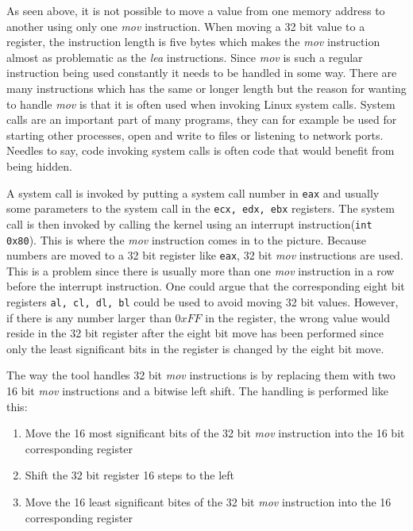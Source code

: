 \documentclass[11pt,twoside]{eitExjobb}
\begin{document}
\noindent As seen above, it is not possible to move a value from one memory address to another using only one \emph{mov} instruction. When moving a 32 bit value to a register, the instruction length is five bytes which makes the \emph{mov} instruction almost as problematic as the \emph{lea} instructions. Since \emph{mov} is such a regular instruction being used constantly it needs to be handled in some way. There are many instructions which has the same or longer length but the reason for wanting to handle \emph{mov} is that it is often used when invoking Linux system calls\cite{syscall}. System calls are an important part of many programs, they can for example be used for starting other processes, open and write to files or listening to network ports. Needles to say, code invoking system calls is often code that would benefit from being hidden. 

A system call is invoked by putting a system call number in \texttt{eax} and usually some parameters to the system call in the \texttt{ecx, edx, ebx} registers. The system call is then invoked by calling the kernel using an interrupt instruction(\texttt{int 0x80}). This is where the \emph{mov} instruction comes in to the picture. Because numbers are moved to a 32 bit register like \texttt{eax}, 32 bit \emph{mov} instructions are used. This is a problem since there is usually more than one \emph{mov} instruction in a row before the interrupt instruction. One could argue that the corresponding eight bit registers \texttt{al, cl, dl, bl} could be used to avoid moving 32 bit values. However, if there is any number larger than $0xFF$ in the register, the wrong value would reside in the 32 bit register after the eight bit move has been performed since only the least significant bits in the register is changed by the eight bit move.

The way the tool handles 32 bit \emph{mov} instructions is by replacing them with two 16 bit \emph{mov} instructions and a bitwise left shift. The handling is performed like this:

\begin{enumerate}
\item{Move the 16 most significant bits of the 32 bit \emph{mov} instruction into the 16 bit corresponding register}
\item{Shift the 32 bit register 16 steps to the left}
\item{Move the 16 least significant bites of the 32 bit \emph{mov} instruction into the 16 corresponding register}
\end{enumerate}	
\end{document}
